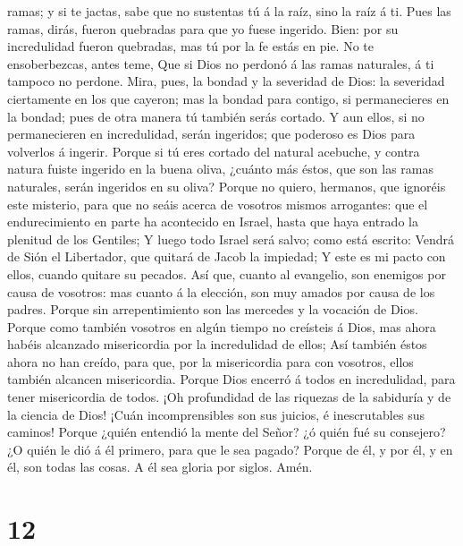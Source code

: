 ramas; y si te jactas, sabe que no sustentas tú á la raíz, sino la raíz
á ti.  Pues las ramas, dirás, fueron quebradas para que
yo fuese ingerido.  Bien: por su incredulidad fueron
quebradas, mas tú por la fe estás en pie. No te ensoberbezcas, antes
teme,  Que si Dios no perdonó á las ramas naturales, á ti
tampoco no perdone.  Mira, pues, la bondad y la severidad
de Dios: la severidad ciertamente en los que cayeron; mas la bondad para
contigo, si permanecieres en la bondad; pues de otra manera tú también
serás cortado.  Y aun ellos, si no permanecieren en
incredulidad, serán ingeridos; que poderoso es Dios para volverlos á
ingerir.  Porque si tú eres cortado del natural acebuche,
y contra natura fuiste ingerido en la buena oliva, ¿cuánto más éstos,
que son las ramas naturales, serán ingeridos en su oliva?
 Porque no quiero, hermanos, que ignoréis este misterio,
para que no seáis acerca de vosotros mismos arrogantes: que el
endurecimiento en parte ha acontecido en Israel, hasta que haya entrado
la plenitud de los Gentiles;  Y luego todo Israel será
salvo; como está escrito: Vendrá de Sión el Libertador, que quitará de
Jacob la impiedad;  Y este es mi pacto con ellos, cuando
quitare su pecados.  Así que, cuanto al evangelio, son
enemigos por causa de vosotros: mas cuanto á la elección, son muy amados
por causa de los padres.  Porque sin arrepentimiento son
las mercedes y la vocación de Dios.  Porque como también
vosotros en algún tiempo no creísteis á Dios, mas ahora habéis alcanzado
misericordia por la incredulidad de ellos;  Así también
éstos ahora no han creído, para que, por la misericordia para con
vosotros, ellos también alcancen misericordia.  Porque
Dios encerró á todos en incredulidad, para tener misericordia de todos.
 ¡Oh profundidad de las riquezas de la sabiduría y de la
ciencia de Dios! ¡Cuán incomprensibles son sus juicios, é inescrutables
sus caminos!  Porque ¿quién entendió la mente del Señor?
¿ó quién fué su consejero?  ¿O quién le dió á él primero,
para que le sea pagado?  Porque de él, y por él, y en él,
son todas las cosas. A él sea gloria por siglos. Amén.

\hypertarget{section-11}{%
\section{12}\label{section-11}}

